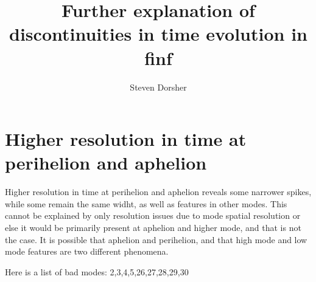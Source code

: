 \documentclass{article}
\begin{document}
\title{Further explanation of discontinuities in time evolution in finf}
\author{Steven Dorsher}
\maketitle

\section{Higher resolution in time at perihelion and aphelion}

Higher resolution in time at perihelion and aphelion reveals some narrower spikes, while some remain the same widht, as well as features in other modes. This cannot be explained by only resolution issues due to mode spatial resolution or else it would be primarily present at aphelion and higher mode, and that is not the case. It is possible that aphelion and perihelion, and that high mode and low mode features are two different phenomena.

Here is a list of bad modes: 2,3,4,5,26,27,28,29,30
\end{document}
